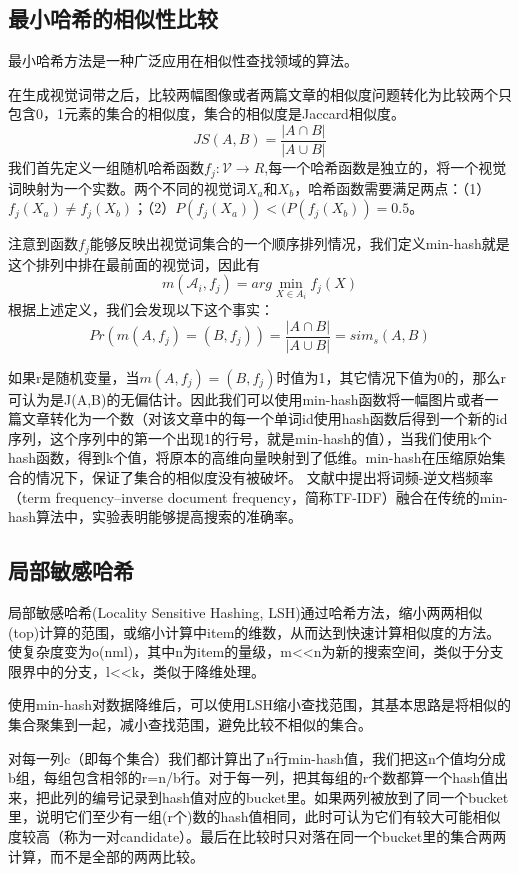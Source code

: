 \subsection{最小哈希的相似性比较}
最小哈希方法是一种广泛应用在相似性查找领域的算法。

在生成视觉词带之后，比较两幅图像或者两篇文章的相似度问题转化为比较两个只包含0，1元素的集合的相似度，集合的相似度是Jaccard相似度。
\[JS(A,B)=\frac{|A\cap{B}|}{|A\cup{B}|}\]
我们首先定义一组随机哈希函数\(f_j:\mathcal{V} \to R\),每一个哈希函数是独立的，将一个视觉词映射为一个实数。两个不同的视觉词\(X_a\)和\(X_b\)，哈希函数需要满足两点：（1）\(f_j(X_a)\neq f_j(X_b)\)；（2）\(P(f_j(X_a)) < (P(f_j(X_b)) = 0.5\)。

注意到函数\(f_j\)能够反映出视觉词集合的一个顺序排列情况，我们定义min-hash就是这个排列中排在最前面的视觉词，因此有
\[m(\mathcal{A}_i,f_j)= arg\mathop {\min }\limits_{X \in A_i}f_j(X)\]
根据上述定义，我们会发现以下这个事实：
\[Pr(m(A,f_j) = (B,f_j)) = \frac{|A\cap{B}|}{|A\cup{B}|} = sim_s(A,B)\]

如果r是随机变量，当\(m(A,f_j) = (B,f_j)\)时值为1，其它情况下值为0的，那么r可认为是J(A,B)的无偏估计。因此我们可以使用min-hash函数将一幅图片或者一篇文章转化为一个数（对该文章中的每一个单词id使用hash函数后得到一个新的id序列，这个序列中的第一个出现1的行号，就是min-hash的值），当我们使用k个hash函数，得到k个值，将原本的高维向量映射到了低维。min-hash在压缩原始集合的情况下，保证了集合的相似度没有被破坏。
文献\cite{Chum:2008jo}中提出将词频-逆文档频率（term frequency–inverse document frequency，简称TF-IDF）融合在传统的min-hash算法中，实验表明能够提高搜索的准确率。

\subsection{局部敏感哈希}
局部敏感哈希(Locality Sensitive Hashing, LSH)通过哈希方法，缩小两两相似(top)计算的范围，或缩小计算中item的维数，从而达到快速计算相似度的方法。使复杂度变为o(nml)，其中n为item的量级，m<<n为新的搜索空间，类似于分支限界中的分支，l<<k，类似于降维处理。

使用min-hash对数据降维后，可以使用LSH缩小查找范围，其基本思路是将相似的集合聚集到一起，减小查找范围，避免比较不相似的集合。

对每一列c（即每个集合）我们都计算出了n行min-hash值，我们把这n个值均分成b组，每组包含相邻的r=n/b行。对于每一列，把其每组的r个数都算一个hash值出来，把此列的编号记录到hash值对应的bucket里。如果两列被放到了同一个bucket里，说明它们至少有一组(r个)数的hash值相同，此时可认为它们有较大可能相似度较高（称为一对candidate）。最后在比较时只对落在同一个bucket里的集合两两计算，而不是全部的两两比较。

